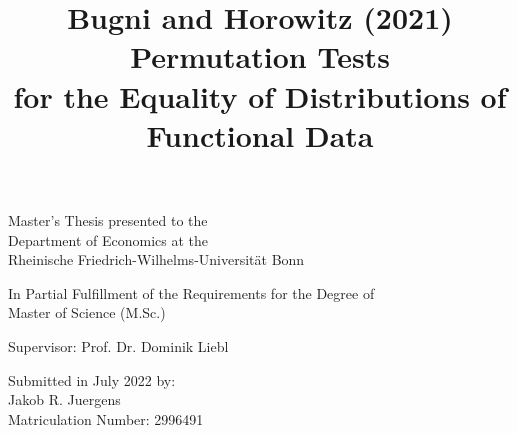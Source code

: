 \documentclass[12pt, a4paper]{article}
\theoremstyle{MAstyle} \newtheorem{assumption}{Assumption}[section]
\theoremstyle{MAstyle} \newtheorem{definition}{Definition}[section]
\theoremstyle{MAstyle} \newtheorem{theorem}{Theorem}[section]
\begin{document}
	
	\title{{\huge Bugni and Horowitz (2021) Permutation Tests\\ for the Equality of Distributions of\\ Functional Data}}
	\date{}
	\maketitle
	\thispagestyle{empty}
	\vspace{1.5 cm}
	\begin{center}
		
		\Large
		Master's Thesis presented to the\\
		Department of Economics at the\\
		Rheinische Friedrich-Wilhelms-Universität Bonn
		\vspace{1.5cm}

		\large
		In Partial Fulfillment of the Requirements for the Degree of\\
		Master of Science (M.Sc.)
		
		\vspace{3cm}
		
		Supervisor: Prof. Dr. Dominik Liebl
		
		\vspace{3cm}
		
		Submitted in July 2022 by: \\
		Jakob R. Juergens\\
		Matriculation Number: 2996491
	\end{center}
	
	\newpage
	
	\thispagestyle{empty}
	\tableofcontents
	\thispagestyle{empty}
	
	\newpage
	
\end{document}
